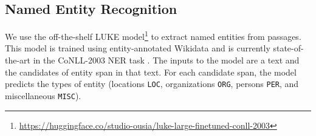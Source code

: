 \documentclass[letterpaper]{article} \usepackage{aaai23}  \usepackage{times}  \usepackage{helvet}  \usepackage{courier}  \usepackage[hyphens]{url}  \usepackage{graphicx} \urlstyle{rm} \def\UrlFont{\rm}  \usepackage{natbib}  \usepackage{caption} \frenchspacing  \setlength{\pdfpagewidth}{8.5in}  \setlength{\pdfpageheight}{11in}  \usepackage{algorithm}
\begin{document}
\subsection{Named Entity Recognition}\label{sec:method_ner}
We use the off-the-shelf LUKE model\footnote{\url{https://huggingface.co/studio-ousia/luke-large-finetuned-conll-2003}} \citep{yamada-etal-2020-luke} to extract named entities from passages.
This model is trained using entity-annotated Wikidata and is currently state-of-the-art in the CoNLL-2003 NER task \citep{tjong-kim-sang-de-meulder-2003-introduction}.
The inputs to the model are a text and the candidates of entity span in that text.
For each candidate span, the model predicts the types of entity (locations \texttt{LOC}, organizations \texttt{ORG}, persons \texttt{PER}, and miscellaneous \texttt{MISC}).
\end{document}
